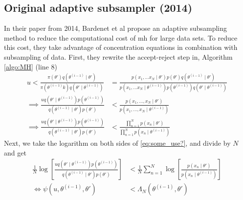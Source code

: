 \documentclass{article}
\theoremstyle{definition}
\begin{document}
\subsection{Original adaptive subsampler (2014)}
In their paper from 2014, Bardenet et al \cite{Bardenet:2} propose an adaptive subsampling method to reduce the computational cost of \gls{mh} for large data sets.  To reduce this cost, they take advantage of concentration equations in combination with subsampling of data. First, they rewrite the accept-reject step in, Algorithm \ref{algo:MH}  (line 8)  
\begin{equation}\label{eq:some_use?}
\begin{split}
    u < \frac{\pi\left(\theta'\right)q\left(\theta^{(i-1)}\mid \theta'\right)}{\pi \left(\theta^{(i-1)}k\right)q\left(\theta'\mid \theta^{(i-1)}\right)} &= \frac{p\left(x_1, \ldots x_N \mid \theta'\right) p\left(\theta'\right)q\left(\theta^{(i-1)}\mid \theta'\right)}{p\left(x_1, \ldots x_N\mid \theta^{(i-1)}\right)p\left(\theta^{(i-1)}\right)q\left(\theta'\mid\theta^{(i-1)}\right)} \\ 
    \implies \frac{u q\left(\theta'\mid \theta^{(i-1)} \right)p\left(\theta^{(i-1)}\right)}{q\left(\theta^{(i-1)}\mid\theta'\right)p\left(\theta'\right)} &< \frac{p\left(x_1, \ldots, x_N \mid \theta'\right)}{p\left(x_1, \ldots, x_N \mid \theta^{(i-1)}\right)} \\
    \implies \frac{u q\left(\theta'\mid \theta^{(i-1)} \right) p\left(\theta^{(i-1)}\right)}{q\left(\theta^{(i-1)} \mid \theta'\right) p \left(\theta'\right)} &< \frac{\prod_{n = 1}^N p\left(x_n\mid \theta'\right)}{\prod_{n = 1}^N p\left(x_n \mid \theta^{(i-1)}\right)}
    \end{split}
\end{equation}
Next, we take the logarithm on both sides of \ref{eq:some_use?}, and divide by $N$ and get
\begin{equation}\label{eq:psi_lambda}
\begin{split}
     \frac{1}{N} \log \left[\frac{u q\left(\theta' \mid \theta^{\left(i-1\right)}\right)p\left(\theta^{\left(i-1\right)}\right)}{q\left(\theta^{\left(i-1\right)}\mid \theta'\right)p\left(\theta'\right)}\right] &< \frac{1}{N} \sum_{n = 1}^N \log \left[\frac{p\left(x_n\mid \theta'\right)}{p\left(x_n \mid \theta^{(i-1)}\right)}\right] \\
     \iff  \psi\left(u, \theta^{(i-1)}, \theta'\right) &< \Lambda_N\left(\theta^{(i-1)},\theta'\right) 
\end{split}
\end{equation}
\end{document}
